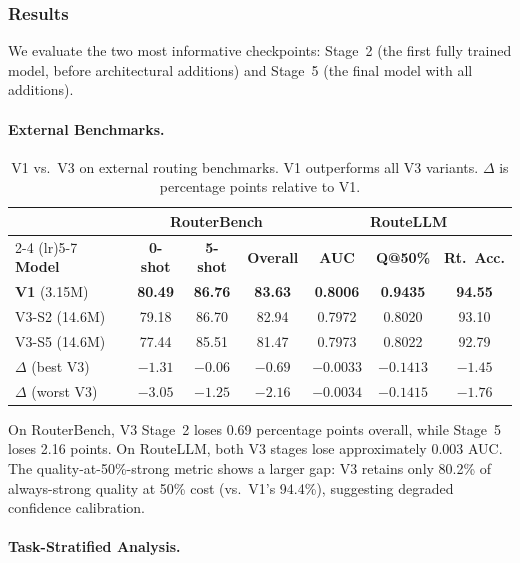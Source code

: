 \subsubsection{Results}

We evaluate the two most informative checkpoints: Stage~2 (the first fully trained model, before architectural additions) and Stage~5 (the final model with all additions).

\paragraph{External Benchmarks.}

\begin{table}[h]
\centering
\caption{V1 vs.\ V3 on external routing benchmarks. V1 outperforms all V3 variants. $\Delta$ is percentage points relative to V1.}
\label{tab:v3_external}
\small
\begin{tabular}{lcccccc}
\toprule
& \multicolumn{3}{c}{\textbf{RouterBench}} & \multicolumn{3}{c}{\textbf{RouteLLM}} \\
\cmidrule(lr){2-4} \cmidrule(lr){5-7}
\textbf{Model} & \textbf{0-shot} & \textbf{5-shot} & \textbf{Overall} & \textbf{AUC} & \textbf{Q@50\%} & \textbf{Rt.\ Acc.} \\
\midrule
\textbf{V1} (3.15M) & \textbf{80.49} & \textbf{86.76} & \textbf{83.63} & \textbf{0.8006} & \textbf{0.9435} & \textbf{94.55} \\
V3-S2 (14.6M) & 79.18 & 86.70 & 82.94 & 0.7972 & 0.8020 & 93.10 \\
V3-S5 (14.6M) & 77.44 & 85.51 & 81.47 & 0.7973 & 0.8022 & 92.79 \\
\midrule
$\Delta$ (best V3) & $-1.31$ & $-0.06$ & $-0.69$ & $-0.0033$ & $-0.1413$ & $-1.45$ \\
$\Delta$ (worst V3) & $-3.05$ & $-1.25$ & $-2.16$ & $-0.0034$ & $-0.1415$ & $-1.76$ \\
\bottomrule
\end{tabular}
\end{table}

On RouterBench, V3 Stage~2 loses 0.69 percentage points overall, while Stage~5 loses 2.16 points. On RouteLLM, both V3 stages lose approximately 0.003 AUC. The quality-at-50\%-strong metric shows a larger gap: V3 retains only 80.2\% of always-strong quality at 50\% cost (vs.\ V1's 94.4\%), suggesting degraded confidence calibration.

\paragraph{Task-Stratified Analysis.}

